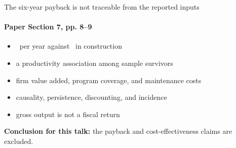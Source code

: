 \documentclass[11pt,aspectratio=169]{beamer}
\begin{document}
\begin{frame}{The six-year payback is not traceable from the reported inputs}
  \hypertarget{app:policy}{}%
  \framesubtitle{Paper Section 7, pp. 8--9}
  \medskip
  \begin{itemize}\setlength{\itemsep}{0.68em}
    \item {} \ResPolicyValue\ per year against \ResPolicyCost\ in construction
    \item {} a productivity association among sample survivors
    \item {} firm value added, program coverage, and maintenance costs
    \item {} causality, persistence, discounting, and incidence
    \item {} gross output is not a fiscal return
  \end{itemize}
  \bigskip
  \textbf{Conclusion for this talk:} the payback and cost-effectiveness claims are excluded.
\end{frame}
\end{document}
